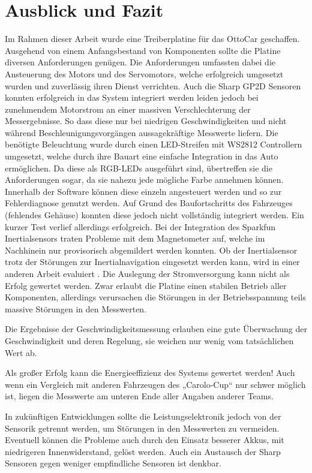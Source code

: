 \chapter{Ausblick und Fazit}

Im Rahmen dieser Arbeit wurde eine Treiberplatine für das OttoCar geschaffen. Ausgehend von einem Anfangsbestand von Komponenten sollte die Platine diversen Anforderungen genügen.
Die Anforderungen umfassten dabei die Ansteuerung des Motors und des Servomotors, welche erfolgreich umgesetzt wurden und zuverlässig ihren Dienst verrichten.
Auch die Sharp GP2D Sensoren konnten erfolgreich in das System integriert werden leiden jedoch bei zunehmendem Motorstrom an einer massiven Verschlechterung der Messergebnisse.
So dass diese nur bei niedrigen Geschwindigkeiten und nicht während Beschleunigungsvorgängen aussagekräftige Messwerte liefern.
Die benötigte Beleuchtung wurde durch einen LED-Streifen mit WS2812 Controllern umgesetzt, welche durch ihre Bauart eine einfache Integration in das Auto ermöglichen.
Da diese als RGB-LEDs ausgeführt sind, übertreffen sie die Anforderungen sogar, da sie nahezu jede mögliche Farbe annehmen können. Innerhalb der Software können diese einzeln angesteuert
werden und so zur Fehlerdiagnose genutzt werden. Auf Grund des Baufortschritts des Fahrzeuges (fehlendes Gehäuse) konnten diese jedoch nicht vollständig integriert werden. Ein kurzer Test
verlief allerdings erfolgreich.
Bei der Integration des Sparkfun Inertialsensors traten Probleme mit dem Magnetometer auf, welche im Nachhinein nur provisorisch abgemildert werden konnten.
Ob der Inertialsensor trotz der Störungen zur Inertialnavigation eingesetzt werden kann, wird in einer anderen Arbeit evaluiert \cite{martins_arbeit}. 
Die Auslegung der Stromversorgung kann nicht als Erfolg gewertet werden. Zwar erlaubt die Platine einen stabilen Betrieb aller Komponenten, allerdings
verursachen die Störungen in der Betriebsspannung teils massive Störungen in den Messwerten. 

Die Ergebnisse der Geschwindigkeitsmessung erlauben eine gute Überwachung der Geschwindigkeit und deren Regelung, sie weichen nur wenig vom tatsächlichen Wert ab.

Als großer Erfolg kann die Energieeffizienz des Systems gewertet werden! Auch wenn ein Vergleich mit anderen Fahrzeugen des „Carolo-Cup“ nur schwer möglich ist, liegen die Messwerte am unteren Ende aller Angaben anderer
Teams.

In zukünftigen Entwicklungen sollte die Leistungselektronik jedoch von der Sensorik getrennt werden, um Störungen in den Messwerten zu vermeiden. Eventuell können die Probleme auch durch
den Einsatz besserer Akkus, mit niedrigeren Innenwiderstand, gelöst werden. Auch ein Austausch der Sharp Sensoren gegen weniger empfindliche Sensoren ist denkbar. 

